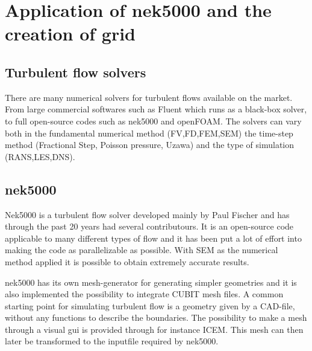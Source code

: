 
\chapter{Application of nek5000 and the creation of grid} %

\label{problem} %


\section{Turbulent flow solvers}

There are many numerical solvers for turbulent flows available on the market.
From large commercial softwares such as Fluent which runs as a 
black-box solver, to full open-source codes such as nek5000 and openFOAM. 
The solvers can vary both in the fundamental numerical method (FV,FD,FEM,SEM) 
the time-step method (Fractional Step, Poisson pressure, Uzawa) 
and the type of simulation (RANS,LES,DNS).


\section{nek5000}
Nek5000 is a turbulent flow solver developed mainly by Paul Fischer
and has through the past 20 years had several contributours. 
It is an open-source code applicable to many different types of flow 
and it has been put a lot of effort into making the code as parallelizable as possible.
With SEM as the numerical method applied it is possible to obtain extremely accurate results.  

nek5000 has its own mesh-generator for generating simpler geometries and it is also implemented the possibility to integrate CUBIT mesh 
files. A common starting point for simulating turbulent flow is a geometry given by a CAD-file,
without any functions to describe the boundaries.
The possibility to make a mesh through a visual gui is provided through for instance ICEM.
This mesh can then later be transformed to the inputfile required by nek5000. 

